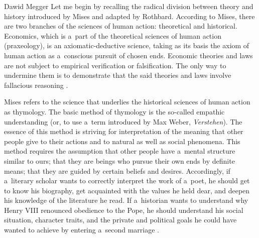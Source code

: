 \begin{artengenv}{Dawid Megger}
Let me begin by recalling the radical division between theory and history introduced by Mises and adapted by Rothbard. According to Mises, there are two branches of the sciences of human action: theoretical and historical. Economics, which is a~part of the theoretical sciences of human action (praxeology), is an axiomatic-deductive science, taking as its basis the axiom of human action as a~conscious pursuit of chosen ends. Economic theories and laws are not subject to empirical verification or falsification. The only way to undermine them is to demonstrate that the said theories and laws involve fallacious reasoning 
\parencite[cf.][pp.30–41]{mises_human_1998}.%




Mises refers to the science that underlies the historical sciences of human action as thymology. The basic method of thymology is the so-called empathic understanding (or, to use a~term introduced by Max Weber, \textit{Verstehen}). The essence of this method is striving for interpretation of the meaning that other people give to their actions and to natural as well as social phenomena. This method requires the assumption that other people have a~mental structure similar to ours; that they are beings who pursue their own ends by definite means; that they are guided by certain beliefs and desires. Accordingly, if a~literary scholar wants to correctly interpret the work of a~poet, he should get to know his biography, get acquainted with the values he held dear, and deepen his knowledge of the literature he read. If a~historian wants to understand why Henry VIII renounced obedience to the Pope, he should understand his social situation, character traits, and the private and political goals he could have wanted to achieve by entering a~second marriage 
\parencite[][pp.264–284]{mises_theory_2007}.%





\end{artengenv}
